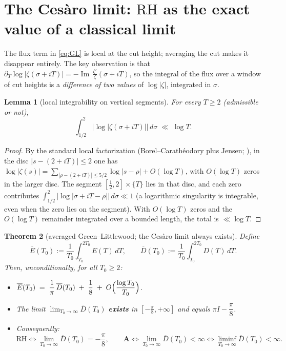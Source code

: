 \documentclass[11pt]{amsart}
\theoremstyle{plain}
\newtheorem{theorem}{Theorem}[section]
\newtheorem{lemma}[theorem]{Lemma}
\theoremstyle{definition}
\theoremstyle{remark}
\newcommand{\RH}{\mathrm{RH}}
\newcommand{\Aax}{\mathbf{A}}
\newcommand{\Imm}{\operatorname{Im}}
\begin{document}
\section{The Ces\`aro limit: $\RH$ as the exact value of a classical limit}\label{sec:cesaro}

The flux term in \eqref{eq:GL} is local at the cut height; averaging the cut makes it disappear entirely. The key observation is that $\partial_T\log|\zeta(\sigma+iT)|=-\Imm\,\frac{\zeta'}{\zeta}(\sigma+iT)$, so the integral of the flux over a window of cut heights is a \emph{difference of two values} of $\log|\zeta|$, integrated in $\sigma$.

\begin{lemma}[local integrability on vertical segments]\label{lem:localint}
For every $T\ge2$ (admissible or not),
\[
\int_{1/2}^{2}\bigl|\log|\zeta(\sigma+iT)|\bigr|\,d\sigma\;\ll\;\log T .
\]
\end{lemma}

\begin{proof}
By the standard local factorization (Borel--Carath\'eodory plus Jensen; \cite[\S3.9]{Titchmarsh1986}), in the disc $|s-(2+iT)|\le2$ one has $\log|\zeta(s)|=\sum_{|\rho-(2+iT)|\le 5/2}\log|s-\rho|+O(\log T)$, with $O(\log T)$ zeros in the larger disc. The segment $[\tfrac12,2]\times\{T\}$ lies in that disc, and each zero contributes $\int_{1/2}^2\bigl|\log|\sigma+iT-\rho|\bigr|\,d\sigma\ll1$ (a logarithmic singularity is integrable, even when the zero lies on the segment). With $O(\log T)$ zeros and the $O(\log T)$ remainder integrated over a bounded length, the total is $\ll\log T$.
\end{proof}

\begin{theorem}[averaged Green--Littlewood; the Ces\`aro limit always exists]\label{thm:cesaro}
Define
\[
\overline E(T_0):=\frac1{T_0}\int_{T_0}^{2T_0}E(T)\,dT,
\qquad
\overline D(T_0):=\frac1{T_0}\int_{T_0}^{2T_0}D(T)\,dT .
\]
Then, unconditionally, for all $T_0\ge2$:
\begin{itemize}
\item[\textup{(a)}] $\displaystyle \overline E(T_0)\;=\;\frac1\pi\,\overline D(T_0)\;+\;\frac18\;+\;O\Bigl(\frac{\log T_0}{T_0}\Bigr)$.
\item[\textup{(b)}] The limit $\displaystyle\lim_{T_0\to\infty}\overline D(T_0)$ \textbf{exists} in $[-\tfrac\pi8,+\infty]$ and equals $\pi I-\dfrac\pi8$.
\item[\textup{(c)}] Consequently:
\[
\RH\iff\lim_{T_0\to\infty}\overline D(T_0)=-\frac\pi8,
\qquad
\Aax\iff\lim_{T_0\to\infty}\overline D(T_0)<\infty
\iff \liminf_{T_0\to\infty}\overline D(T_0)<\infty .
\]
\end{itemize}
\end{theorem}
\end{document}
